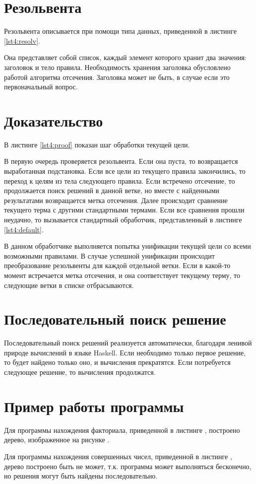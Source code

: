 \section{Резольвента}
Резольвента описывается при помощи типа данных, приведенной в листинге \ref{lst4:resolv}.


Она представляет собой список, каждый элемент которого хранит два значения: заголовок и тело правила. Необходимость хранения заголовка обусловлено работой алгоритма отсечения. Заголовка может не быть, в случае если это первоначальный вопрос.

\section{Доказательство}
В листинге \ref{lst4:proof} показан шаг обработки текущей цели.


В первую очередь проверяется резольвента. Если она пуста, то возвращается выработанная подстановка. Если все цели из текущего правила закончились, то переход к целям из тела следующего правила.
Если встречено отсечение, то продолжается поиск решений в данной ветке, но вместе с найденными результатами возвращается метка отсечения.
Далее происходит сравнение текущего терма с другими стандартными термами. Если все сравнения прошли неудачно, то вызывается стандартный обработчик, представленный в листинге \ref{lst4:default}.


В данном обработчике выполняется попытка унификации текущей цели со всеми возможными правилами. В случае успешной унификации происходит преобразование резольвенты для каждой отдельной ветки. Если в какой-то момент встречается метка отсечения, и она соответствует текущему терму, то следующие ветки в списке отбрасываются.

\section{Последовательный поиск решение}
Последовательный поиск решений реализуется автоматически, благодаря ленивой природе вычислений в языке Haskell. Если необходимо только первое решение, то будет найдено только оно, и вычисления прекратятся. Если потребуется следующее решение, то вычисления продолжатся.

\section{Пример работы программы}
Для программы нахождения факториала, приведенной в листинге , построено дерево, изображенное на рисунке .

Для программы нахождения совершенных чисел, приведенной в листинге , дерево построено быть не может, т.к. программа может выполняться бесконечно, но решения могут быть найдены последовательно.